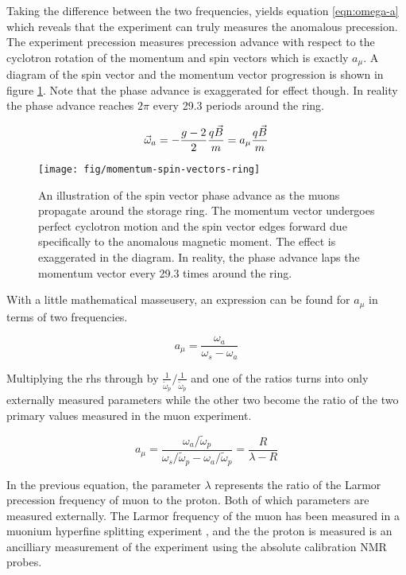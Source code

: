 Taking the difference between the two frequencies, yields equation \ref{eqn:omega-a} which reveals that the experiment can truly measures the anomalous precession.  The experiment precession measures precession advance with respect to the cyclotron rotation of the momentum and spin vectors which is exactly $a_\mu$.  A diagram of the spin vector and the momentum vector progression is shown in figure \ref{fig:momentum-spin-vectors-ring}.  Note that the phase advance is exaggerated for effect though.  In reality the phase advance reaches $2\pi$ every 29.3 periods around the ring.

\begin{equation}
\label{eqn:omega-a}
\vec{\omega}_a = -\frac{g - 2}{2} \frac{q \vec{B}}{m} \\
= a_\mu \frac{q \vec{B}}{m}
\end{equation}

\begin{figure}
\label{fig:momentum-spin-vectors-ring}
\centering
\texttt{[image: fig/momentum-spin-vectors-ring]}
\caption{An illustration of the spin vector phase advance as the muons propagate around the storage ring.  The momentum vector undergoes perfect cyclotron motion and the spin vector edges forward due specifically to the anomalous magnetic moment.  The effect is exaggerated in the diagram.  In reality, the phase advance laps the momentum vector every 29.3 times around the ring.}
\end{figure}

With a little mathematical masseusery, an expression can be found for $a_\mu$ in terms of two frequencies.

\begin{equation}
\label{eqn:a-mu-precession-1}
a_\mu = \frac{\omega_a}{\omega_s - \omega_a}
\end{equation}

\noindent
Multiplying the rhs through by $\frac{1}{\tilde{\omega}_p}/\frac{1}{\tilde{\omega}_p}$ and one of the ratios turns into only externally measured parameters while the other two become the ratio of the two primary values measured in the muon \gmtwo experiment.

\begin{equation}
\label{eqn:a-mu-precession-2}
a_\mu = \frac{\omega_a/\tilde{\omega}_p}{\omega_s/\tilde{\omega}_p - \omega_a/\tilde{\omega}_p} = \frac{R}{\lambda - R}
\end{equation}

\noindent
In the previous equation, the parameter $\lambda$ represents the ratio of the Larmor precession frequency of muon to the proton.  Both of which parameters are measured externally.  The Larmor frequency of the muon has been measured in a muonium hyperfine splitting experiment \cite{muonium-hyperfine}, and the the proton is measured is an ancilliary measurement of the \gmtwo experiment using the absolute calibration NMR probes.

